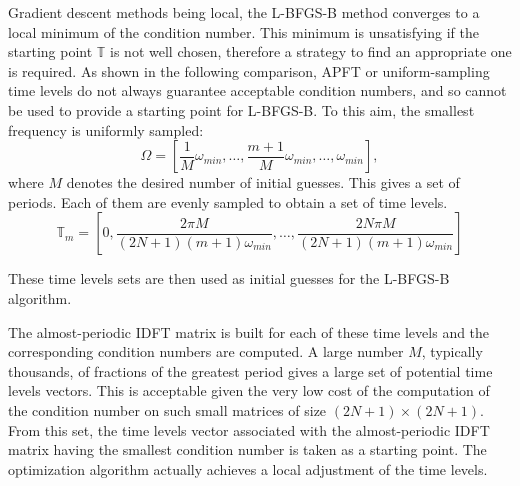 Gradient descent methods being local, the L-BFGS-B method converges to a local
minimum of the condition number.  This minimum is unsatisfying if the
starting point $\mathbb{T}$ is not well chosen, therefore a strategy
to find an appropriate one is required.  As shown in the following
comparison, APFT or uniform-sampling time levels do not always
guarantee acceptable condition numbers, and so cannot be used to
provide a starting point for L-BFGS-B. To this aim, the smallest
frequency is uniformly sampled:
\begin{equation}
    \Omega = [\frac{1}{M} \omega_{min}, \ldots, \frac{m+1}{M} \omega_{min}, \ldots, \omega_{min}],
    \label{eq:slitted_period}
\end{equation}
where $M$ denotes the desired number of initial guesses.
This gives a set of periods. Each of them are evenly sampled to obtain a
set of time levels. 
\begin{equation}
    \mathbb{T}_m = \left[ 0, \frac{2 \pi M}{ (2N + 1) (m+1) \omega_{min}}, \ldots, 
                             \frac{2N \pi M}{ (2N + 1) (m+1) \omega_{min}} \right]
    \label{eq:set_of_tlv}
\end{equation}

These time levels sets are then used as initial guesses for the
L-BFGS-B algorithm.

The almost-periodic IDFT matrix is built for
each of these time levels and the corresponding condition numbers are
computed.  A large number $M$, typically thousands, of fractions of the
greatest period gives a large set of potential time levels vectors.
This is acceptable given the very low cost of the computation of the
condition number on such small matrices of size $(2N + 1) \times
(2N+1)$.  From this set, the time levels vector associated with the
almost-periodic IDFT matrix having the smallest condition number is
taken as a starting point.  The optimization algorithm actually achieves
a local adjustment of the time levels.


